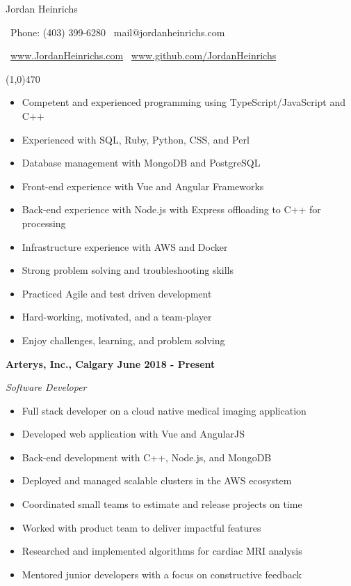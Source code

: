 \documentclass[12pt]{article}
\begin{document}
\centerline{{\Huge \sc Jordan Heinrichs}}
\medskip
\centerline{\textbullet\ Phone: (403) 399-6280 \hspace{5pt} \textbullet\ mail@jordanheinrichs.com}
\centerline{\textbullet\ \url{www.JordanHeinrichs.com}  \hspace{5pt} \textbullet\ \url{www.github.com/JordanHeinrichs}}
\noindent
\line(1,0){470}\\

\bigskip
{}
\medskip

\begin{itemize}
\item Competent and experienced programming using TypeScript/JavaScript and C++
\item Experienced with SQL, Ruby, Python, CSS, and Perl
\item Database management with MongoDB and PostgreSQL
\item Front-end experience with Vue and Angular Frameworks
\item Back-end experience with Node.js with Express offloading to C++ for processing
\item Infrastructure experience with AWS and Docker
\item Strong problem solving and troubleshooting skills
\item Practiced Agile and test driven development
\item Hard-working, motivated, and a team-player
\item Enjoy challenges, learning, and problem solving
\end{itemize}
\noindent

\bigskip
{}
\bigskip

\noindent \centerline{ \bf Arterys, Inc., Calgary \hfill June 2018 - Present}
\indent \emph{ Software Developer }
\begin{itemize}
  \item Full stack developer on a cloud native medical imaging application
  \item Developed web application with Vue and AngularJS
  \item Back-end development with C++, Node.js, and MongoDB
  \item Deployed and managed scalable clusters in the AWS ecosystem
  \item Coordinated small teams to estimate and release projects on time
  \item Worked with product team to deliver impactful features
  \item Researched and implemented algorithms for cardiac MRI analysis
  \item Mentored junior developers with a focus on constructive feedback
\end{itemize}
\medskip
\end{document}
